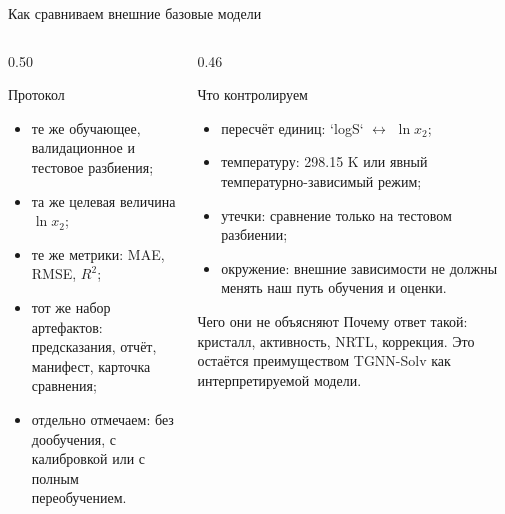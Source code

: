 \documentclass[aspectratio=169,10pt]{beamer}
\newcommand{\tightitems}{\setlength{\itemsep}{0.25em}}
\begin{document}
\begin{frame}{Как сравниваем внешние базовые модели}
  \small
  \begin{columns}[T,onlytextwidth]
    \begin{column}{0.50\textwidth}
      \begin{block}{Протокол}
        \scriptsize
        \begin{itemize}\tightitems
          \item те же обучающее, валидационное и тестовое разбиения;
          \item та же целевая величина $\ln x_2$;
          \item те же метрики: MAE, RMSE, $R^2$;
          \item тот же набор артефактов: предсказания, отчёт, манифест, карточка сравнения;
          \item отдельно отмечаем: без дообучения, с калибровкой или с полным переобучением.
        \end{itemize}
      \end{block}
    \end{column}
    \begin{column}{0.46\textwidth}
      \begin{block}{Что контролируем}
        \scriptsize
        \begin{itemize}\tightitems
          \item пересчёт единиц: `logS` $\leftrightarrow$ $\ln x_2$;
          \item температуру: 298.15 K или явный температурно-зависимый режим;
          \item утечки: сравнение только на тестовом разбиении;
          \item окружение: внешние зависимости не должны менять наш путь обучения и оценки.
        \end{itemize}
      \end{block}
      \begin{block}{Чего они не объясняют}
        \scriptsize
        Почему ответ такой: кристалл, активность, NRTL, коррекция. Это остаётся преимуществом TGNN-Solv как интерпретируемой модели.
      \end{block}
    \end{column}
  \end{columns}
\end{frame}
\end{document}
